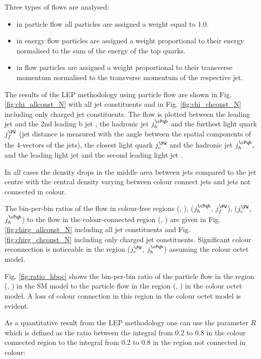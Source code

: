 \label{sec:LEP_methodology}

Three types of flows are analysed:
\begin{itemize}
\item in particle flow all particles are assigned a weight equal to 1.0.
\item in energy flow particles are assigned a weight proportional to their energy normalised to the sum of the energy of the top quarks.
\item in \pt flow particles are assigned a weight proportional to their transverse momentum normalised to the transverse momentum of the respective jet.
\end{itemize}

The results of the LEP methodology using particle flow are shown in Fig. \ref{fig:chi_allconst_N} with all jet constituents and in Fig. \ref{fig:chi_chconst_N} including only charged jet constituents. The flow is plotted between the leading \cPqb jet \leadingb and the 2nd leading b jet \scndleadingb, the hadronic \cPqb jet $j_{h}^{\cPqb}$ and the furthest light quark $j_{f}^{\PW}$ (jet distance is measured with the angle between the spatial components of the 4-vectors of the jets), the closest light quark $j_{c}^{\PW}$ and the hadronic \cPqb jet $j_{h}^{\cPqb}$, and the leading light jet \leadingjet and the second leading light jet \scndleadingjet.

In all cases the density drops in the middle area between jets compared to the jet centre with the central density varying between colour connect jets and jets not connected in colour.

The bin-per-bin ratios of the flow in colour-free regions (\leadingb, \scndleadingb), ($j_{h}^{\cPqb}$, $j_{f}^{\PW}$), ($j_{c}^{\PW}$, $j_{h}^{\cPqb}$) to the flow in the colour-connected region (\leadingjet, \scndleadingjet) are given in Fig. \ref{fig:chirg_allconst_N} including all jet constituents and Fig. \ref{fig:chirg_chconst_N} including only charged jet constituents. Significant colour reconnection is noticeable in the region ($j_{c}^{\PW}$, $j_{h}^{\cPqb}$) assuming the colour octet \PW model.

Fig. \ref{fig:ratio_hbqc} shows the bin-per-bin ratio of the particle flow in the region (\leadingjet, \scndleadingjet) in the SM model to the particle flow in the region (\leadingjet, \scndleadingjet) in the colour octet \PW model. A loss of colour connection in this region in the colour octet \PW model is evident.

As a quantitative result from the LEP methodology one can use the parameter $R$ which is defined as the ratio between the integral from 0.2 to 0.8 in the colour connected region to the integral from 0.2 to 0.8 in the region not connected in colour:

